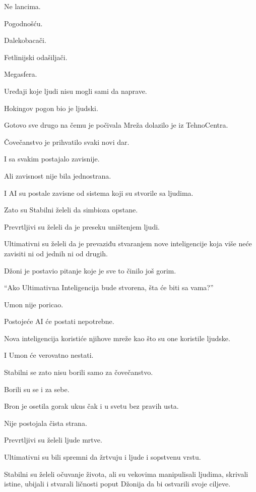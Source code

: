 Ne lancima.

Pogodnošću.

Dalekobacači.

Fetlinijski odašiljači.

Megasfera.

Uređaji koje ljudi nisu mogli sami da naprave.

Hokingov pogon bio je ljudski.

Gotovo sve drugo na čemu je počivala Mreža dolazilo je iz TehnoCentra.

Čovečanstvo je prihvatilo svaki novi dar.

I sa svakim postajalo zavisnije.

\bigskip

Ali zavisnost nije bila jednostrana.

I AI su postale zavisne od sistema koji su stvorile sa ljudima.

Zato su Stabilni želeli da simbioza opstane.

Prevrtljivi su želeli da je preseku uništenjem ljudi.

Ultimativni su želeli da je prevaziđu stvaranjem nove inteligencije koja više neće zavisiti ni od jednih ni od drugih.

\bigskip

Džoni je postavio pitanje koje je sve to činilo još gorim.

``Ako Ultimativna Inteligencija bude stvorena, šta će biti sa vama?''

Umon nije poricao.

Postojeće AI će postati nepotrebne.

Nova inteligencija koristiće njihove mreže kao što su one koristile ljudske.

I Umon će verovatno nestati.

Stabilni se zato nisu borili samo za čovečanstvo.

Borili su se i za sebe.

\bigskip

Bron je osetila gorak ukus čak i u svetu bez pravih usta.

Nije postojala čista strana.

Prevrtljivi su želeli ljude mrtve.

Ultimativni su bili spremni da žrtvuju i ljude i sopstvenu vrstu.

Stabilni su želeli očuvanje života, ali su vekovima manipulisali ljudima, skrivali istine, ubijali i stvarali ličnosti poput Džonija da bi ostvarili svoje ciljeve.

